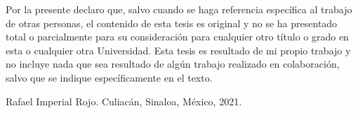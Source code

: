 
\begin{spacing}{1.5}
    \noindent Por la presente declaro que, salvo cuando se haga referencia específica al trabajo de otras personas, el contenido de esta tesis es original y no se ha presentado total o parcialmente para su consideración para cualquier otro título o grado en esta o cualquier otra Universidad. Esta tesis es resultado de mi propio trabajo y no incluye nada que sea resultado de algún trabajo realizado en colaboración, salvo que se indique específicamente en el texto.
\end{spacing}


\begin{flushright}
Rafael Imperial Rojo. Culiacán, Sinaloa, México, 2021.
\end{flushright}